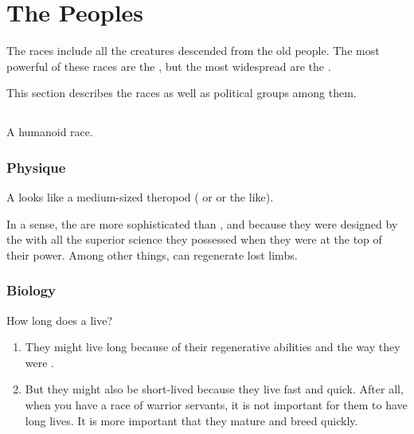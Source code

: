 
\chapter{The \Ophidian Peoples}
The \ophidian{} races include all the creatures descended from the old \ophidian{} people. 
The most powerful of these races are the \dragons, but the most widespread are the \scathae. 

This section describes the \ophidian{} races as well as political groups among them. 















\section{\Cregorr}
\index{\cregorr}
A \saurian{} humanoid race. 









\subsection{Physique}
A \cregorr{} looks like a medium-sized theropod ( or  or the like). 

In a sense, the \cregorrs{} are more sophisticated than \scathae, \nephilim{} and \humans{} because they were designed by the \ophidians{}  with all the superior science they possessed when they were at the top of their power. 
Among other things, \cregorrs{} can regenerate lost limbs. 








\subsection{Biology}
How long does a \cregorr{} live? 

\begin{enumerate}
  \item 
    They might live long because of their regenerative abilities and the way they were . 
  
  \item 
    But they might also be short-lived because they live fast and  quick. 
    After all, when you have a race of warrior servants, it is not important for them to have long lives. 
    It is more important that they mature and breed quickly. 
\end{enumerate}









